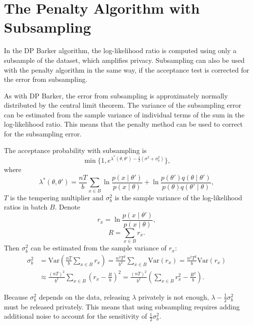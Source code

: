 \documentclass[english,twoside,openright]{HYgraduMLDS}
\newcommand{\var}{\mathrm{Var}}
\begin{document}
\section{The Penalty Algorithm with Subsampling}\label{dp_minibatch_penalty_section}

In the DP Barker algorithm, the log-likelihood ratio is computed using only
a subsample of the dataset, which amplifies privacy. Subsampling can also be used
with the penalty algorithm in the same way, if the acceptance test is 
corrected for the error from subsampling.

As with DP Barker, the error from subsampling is approximately normally 
distributed by the central limit theorem. The variance of the subsampling 
error can be estimated from the sample variance of individual terms of the 
sum in the log-likelihood ratio. This means that the penalty method can be used
to correct for the subsampling error.

The acceptance probability with subsampling is
\[
    \min\{1, e^{\lambda^*(\theta, \theta') - \frac{1}{2}(\sigma^2 + \sigma_b^2)}\},
\]
where
\[
    \lambda^*(\theta, \theta') = \frac{nT}{b}\sum_{x\in B}
    \ln \frac{p(x\mid \theta')}{p(x \mid \theta)}
    + \ln \frac{p(\theta')q(\theta \mid \theta')}{p(\theta)q(\theta' \mid \theta)},
\]
\(T\) is the tempering multiplier
and \(\sigma_b^2\) is the sample variance of the log-likelihood ratios in
batch \(B\). Denote
\[
    r_x = \ln \frac{p(x\mid \theta')}{p(x\mid \theta)},
\]
\[
    R = \sum_{x\in B}r_x.
\]
Then \(\sigma^2_b\) can be estimated from the sample variance of \(r_x\):
\begin{align*}
    \sigma_b^2 
    &= \var\left(\frac{nT}{b}\sum_{x\in B}r_x\right)
    = \frac{n^{2}T^2}{b^2}\sum_{x\in B}\var(r_x)
    = \frac{n^{2}T^2}{b}\var(r_x)
  \\&\approx\frac{(nT)^2}{b^2}
    \sum_{x\in B}\left(r_x - \frac{R}{b}\right)^2
    = \frac{(nT)^2}{b^2}\left(\sum_{x\in B}r_x^2 - \frac{R^2}{b}\right).
\end{align*}

Because \(\sigma_b^2\) depends on the data, releasing \(\lambda\) privately is 
not enough, \(\lambda - \frac{1}{2}\sigma_b^2\) must be released privately.
This means that using subsampling requires adding additional noise to account 
for the sensitivity of \(\frac{1}{2}\sigma_b^2\).
\end{document}
